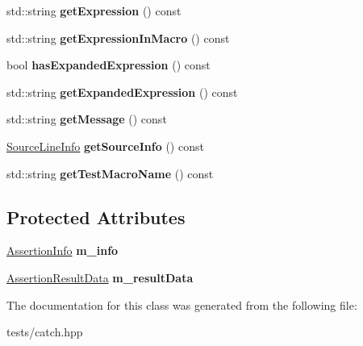 \begin{DoxyCompactItemize}
std\+::string {\bfseries get\+Expression} () const
\item 
\mbox{\label{class_catch_1_1_assertion_result_aac35a0ca42d33bff6467c76573730f5e}} 
std\+::string {\bfseries get\+Expression\+In\+Macro} () const
\item 
\mbox{\label{class_catch_1_1_assertion_result_a78c43506c2b3d8cc1fb141a97d09ec94}} 
bool {\bfseries has\+Expanded\+Expression} () const
\item 
\mbox{\label{class_catch_1_1_assertion_result_aaa46070791a6c07caaed86229b8d9d75}} 
std\+::string {\bfseries get\+Expanded\+Expression} () const
\item 
\mbox{\label{class_catch_1_1_assertion_result_ae730943beed46921b09383c673e35786}} 
std\+::string {\bfseries get\+Message} () const
\item 
\mbox{\label{class_catch_1_1_assertion_result_aa4d3fdbfe276a69a035762dbb790800f}} 
\hyperlink{struct_catch_1_1_source_line_info}{Source\+Line\+Info} {\bfseries get\+Source\+Info} () const
\item 
\mbox{\label{class_catch_1_1_assertion_result_aaefd9a0384282fd08a4a72aa19bd0628}} 
std\+::string {\bfseries get\+Test\+Macro\+Name} () const
\end{DoxyCompactItemize}
\subsection*{Protected Attributes}
\begin{DoxyCompactItemize}
\item 
\mbox{\label{class_catch_1_1_assertion_result_a3e7236f73a51d6fc8bb9dfdefcee7772}} 
\hyperlink{struct_catch_1_1_assertion_info}{Assertion\+Info} {\bfseries m\+\_\+info}
\item 
\mbox{\label{class_catch_1_1_assertion_result_add3455b8bbedb0d643e18da67c66b4f7}} 
\hyperlink{struct_catch_1_1_assertion_result_data}{Assertion\+Result\+Data} {\bfseries m\+\_\+result\+Data}
\end{DoxyCompactItemize}


The documentation for this class was generated from the following file\+:\begin{DoxyCompactItemize}
\item 
tests/catch.\+hpp\end{DoxyCompactItemize}
